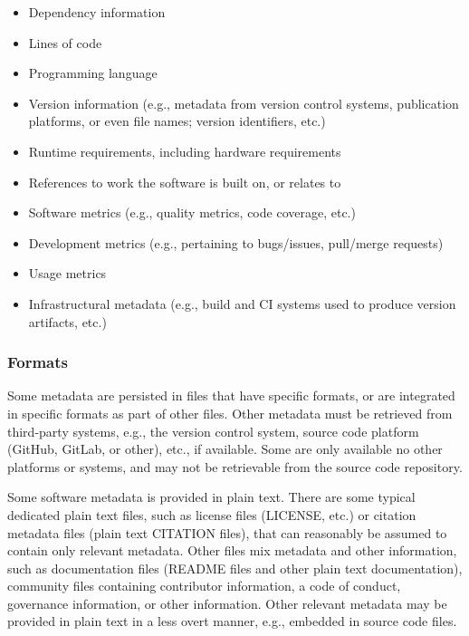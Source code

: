\documentclass{article}
\begin{document}
\begin{itemize}  
  \item Dependency information
  \item Lines of code
  \item Programming language
  \item Version information (e.g., metadata from version control systems, publication platforms, or even file names; version identifiers, etc.)
  \item Runtime requirements, including hardware requirements
  \item References to work the software is built on, or relates to
  \item Software metrics (e.g., quality metrics, code coverage, etc.)
  \item Development metrics (e.g., pertaining to bugs/issues, pull/merge requests)
  \item Usage metrics
  \item Infrastructural metadata (e.g., build and CI systems used to produce version artifacts, etc.)
\end{itemize}

\subsubsection{Formats}\label{subsec:metadata-formats}
Some metadata are persisted in files that have specific formats, or are integrated in specific formats as part of other files. Other metadata must be retrieved from third-party systems, e.g., the version control system, source code platform (GitHub, GitLab, or other), etc., if available. Some are only available no other platforms or systems, and may not be retrievable from the source code repository.



\label{subsubsec:metadata-formats-plaintext}
Some software metadata is provided in plain text. There are some typical dedicated plain text files, such as license files (LICENSE, etc.) or citation metadata files (plain text CITATION files), that can reasonably be assumed to contain only relevant metadata. Other files mix metadata and other information, such as documentation files (README files and other plain text documentation), community files containing contributor information, a code of conduct, governance information, or other information. Other relevant metadata may be provided in plain text in a less overt manner, e.g., embedded in source code files. 
\end{document}

